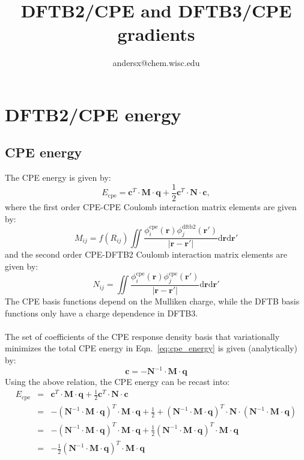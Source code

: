 \documentclass{article}
\title{DFTB2/CPE and DFTB3/CPE gradients}
\author{andersx@chem.wisc.edu}
\numberwithin{equation}{section}
\begin{document}
\section{DFTB2/CPE energy}
\subsection{CPE energy}
The CPE energy is given by:\cite{cpekaminski}
\begin{equation}
    E_{\mathrm{cpe}} = \mathbf{c}^T \cdot \mathbf{M} \cdot \mathbf{q} + \frac{1}{2} \mathbf{c}^T \cdot \mathbf{N} \cdot \mathbf{c},\label{eq:cpe_energy}
\end{equation}
where the first order CPE-CPE Coulomb interaction matrix elements are given by:
\begin{equation}
    M_{ij} = f(R_{ij})\iint \frac{\phi_i^\mathrm{cpe}\left(\mathbf{r}\right)\phi_j^\mathrm{dftb2}\left(\mathbf{r'}\right)}{\left| \mathbf{r} - \mathbf{r'}\right|} \mathrm{d}\mathbf{r}\mathrm{d}\mathbf{r'}
\end{equation}
and the second order CPE-DFTB2 Coulomb interaction matrix elements are given by:
\begin{equation}
    N_{ij} = \iint \frac{\phi_i^\mathrm{cpe}\left(\mathbf{r}\right)\phi_j^\mathrm{cpe}\left(\mathbf{r'}\right)}{\left| \mathbf{r} - \mathbf{r'}\right|} \mathrm{d}\mathbf{r}\mathrm{d}\mathbf{r'}
\end{equation}
The CPE basis functions depend on the Mulliken charge, while the DFTB basis functions only have a charge dependence in DFTB3.
\\\\The set of coefficients of the CPE response density basis that variationally minimizes the total CPE energy in Eqn.~\ref{eq:cpe_energy} is given (analytically) by:
\begin{equation}
    \mathbf{c}= -\mathbf{N}^{-1} \cdot \mathbf{M} \cdot \mathbf{q}
\end{equation}
Using the above relation, the CPE energy can be recast into:
\begin{eqnarray}
    E_{\mathrm{cpe}}
    &=& \mathbf{c}^T \cdot \mathbf{M} \cdot \mathbf{q} + \frac{1}{2} \mathbf{c}^T \cdot \mathbf{N} \cdot \mathbf{c} \\
    &=& -(\mathbf{N}^{-1} \cdot \mathbf{M} \cdot \mathbf{q})^T \cdot \mathbf{M} \cdot \mathbf{q} + \frac{1}{2} + (\mathbf{N}^{-1} \cdot \mathbf{M} \cdot \mathbf{q})^T \cdot \mathbf{N} \cdot (\mathbf{N}^{-1} \cdot \mathbf{M} \cdot \mathbf{q})\\
    &=& -(\mathbf{N}^{-1} \cdot \mathbf{M} \cdot \mathbf{q})^T \cdot \mathbf{M} \cdot \mathbf{q} + \frac{1}{2} (\mathbf{N}^{-1} \cdot \mathbf{M} \cdot \mathbf{q})^T  \cdot \mathbf{M} \cdot \mathbf{q}\\
    &=& -\frac{1}{2} (\mathbf{N}^{-1} \cdot \mathbf{M} \cdot \mathbf{q})^T  \cdot \mathbf{M} \cdot \mathbf{q}
\end{eqnarray}
\end{document}
